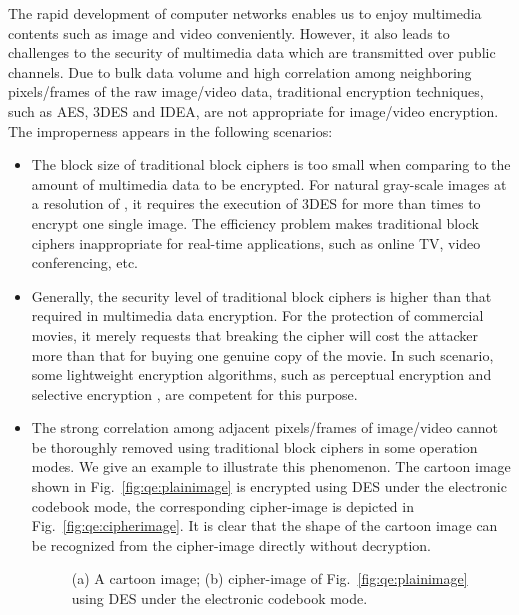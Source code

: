 \documentclass[smallextended, final]{svjour3}          \smartqed
\newlength\imagewidth
\begin{document}
{The rapid development of computer networks enables us to enjoy multimedia contents such as image and video conveniently.
However, it also leads to challenges to the security of multimedia data which are transmitted over public channels.}
Due to bulk data volume and high correlation among neighboring pixels/frames of the raw image/video data,
traditional encryption techniques, such as AES, 3DES and IDEA, are not appropriate for {image/video} encryption.
The improperness appears in the following scenarios:
\begin{itemize}
\item The block size of traditional block ciphers is too small when comparing to the amount of multimedia data to be
encrypted. For natural gray-scale images at a resolution of , it requires the execution of 3DES for more than  times to encrypt
one single image. The efficiency problem makes traditional block ciphers inappropriate for real-time applications, such as online TV,
video conferencing, etc.
\item Generally, the security level of traditional block ciphers is higher than that required in multimedia data encryption.
For the protection of commercial movies, it merely requests that breaking the cipher will cost the attacker more than that for buying one genuine copy of the movie.
In such scenario, some lightweight encryption algorithms, such as perceptual encryption \cite{li2007design} and selective encryption \cite{kim2011selective}, are
competent for this purpose.
\item The strong correlation among adjacent pixels/frames of image/video cannot be thoroughly removed using traditional block ciphers in some operation modes.
We give an example to illustrate this phenomenon. The cartoon image shown in Fig.~\ref{fig:qe:plainimage} is encrypted using DES under the electronic codebook mode,
the corresponding cipher-image is depicted in Fig.~\ref{fig:qe:cipherimage}.
It is clear that the shape of the cartoon image can be recognized from the cipher-image directly without decryption.

\begin{figure}[!htb]
\centering
\subfigure[]{
    \label{fig:qe:plainimage}
    \begin{minipage}[t]{\imagewidth}
    \centering
    \texttt{[image: qe]}
    \end{minipage}}
\caption{
(a) A cartoon image;
(b) cipher-image of Fig.~\ref{fig:qe:plainimage} using DES under the electronic codebook mode.}
\label{fig:qe}
\end{figure}

\end{itemize}
\end{document}

